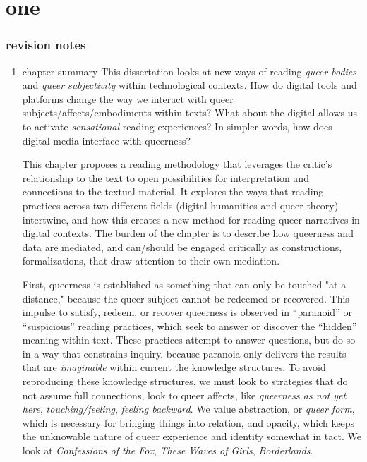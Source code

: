 \documentclass[11pt]{article}
\author{Filipa  Calado}
\date{\today}
\title{}
\begin{document}
\tableofcontents

\section{one}
\label{sec:org7853921}

\subsubsection{revision notes}
\label{sec:org7805c08}
\begin{enumerate}
\item chapter summary
\label{sec:org390325d}
This dissertation looks at new ways of reading \emph{queer bodies} and
\emph{queer subjectivity} within technological contexts. How do digital
tools and platforms change the way we interact with queer
subjects/affects/embodiments within texts? What about the digital
allows us to activate \emph{sensational} reading experiences? In simpler
words, how does digital media interface with queerness?

This chapter proposes a reading methodology that leverages the
critic's relationship to the text to open possibilities for
interpretation and connections to the textual material. It explores
the ways that reading practices across two different fields (digital
humanities and queer theory) intertwine, and how this creates a new
method for reading queer narratives in digital contexts. The burden of
the chapter is to describe how queerness and data are mediated, and
can/should be engaged critically as constructions, formalizations,
that draw attention to their own mediation.

First, queerness is established as something that can only be touched
"at a distance," because the queer subject cannot be redeemed or
recovered. This impulse to satisfy, redeem, or recover queerness is
observed in “paranoid” or “suspicious” reading practices, which seek
to answer or discover the “hidden” meaning within text. These
practices attempt to answer questions, but do so in a way that
constrains inquiry, because paranoia only delivers the results that
are \emph{imaginable} within current the knowledge structures. To avoid
reproducing these knowledge structures, we must look to strategies
that do not assume full connections, look to queer affects, like
\emph{queerness as not yet here}, \emph{touching/feeling}, \emph{feeling
backward}. We value abstraction, or \emph{queer form}, which is necessary
for bringing things into relation, and opacity, which keeps the
unknowable nature of queer experience and identity somewhat in
tact. We look at \emph{Confessions of the Fox}, \emph{These Waves of Girls},
\emph{Borderlands}.


\end{enumerate}
\end{document}
